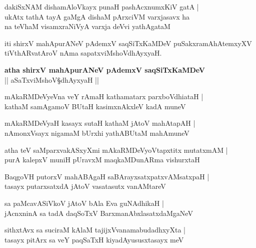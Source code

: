 \begin{shloka}
dakiSxNAM dishamAloVkayx punaH pashAcxnumxKiV gatA |\\
ukAtx tathA tayA gaMgA dishaM pArxciVM varxjasavx ha\\
na teVhaM visamxraNiVyA varxja deVvi yathAgataM
\end{shloka}
iti shirxV mahApurANeV pAdemxV saqSiTxKaMDeV puSakxramAhAtemxyXV tiVthARvatAroV nAma sapatxviMshoVdhAyxyaH.

\begin{center}
\textbf{\large atha shirxV mahApurANeV pAdemxV saqSiTxKaMDeV}\\
|| aSaTxviMshoV\S dhAyxyaH ||
\end{center}

\setcounter{shloka}{0}
\begin{shloka}
mAkaRMDeVyeVna veY rAmaH kathamatarx parxboVdhiataH |\\
kathaM samAgamoV BUtaH kasimxnAkxleV kadA muneV
\end{shloka}

\begin{shloka}
mAkaRMDeVyaH kasayx sutaH kathaM jAtoV mahAtapAH |\\
nAmonxVsayx nigamaM bUrxhi yathABUtaM mahAmuneV 
\end{shloka}

\begin{shloka}
atha teV saMparxvakASxyXmi mAkaRMDeVyoVtapxtitx mutatxmAM |\\
purA kalepxV muniH pUravxM maqkaMDunARma vishurxtaH
\end{shloka}

\begin{shloka}
BaqgoVH putorxV mahABAgaH saBArayxsatxpatxvAMsatxpaH |\\
tasayx putarxsatxdA jAtoV vasatasutx vanAMtareV 
\end{shloka}

\begin{shloka}
sa paMcavASiVkoV jAtoV bAla Eva guNAdhikaH |\\
jAcnxninA sa tadA daqSoTxV BarxmanAbxlasatxdaMgaNeV 
\end{shloka}

\begin{shloka}
sithxtAvx sa suciraM kAlaM tajijxVvanamabudadhxyXta |\\
tasayx pitArx sa veY paqSaTxH kiyadAyususxtasayx meV 
\end{shloka}

